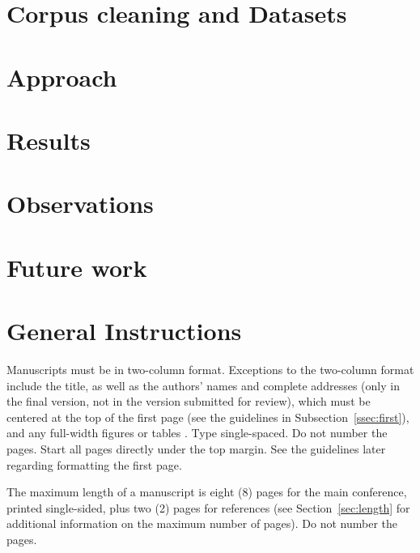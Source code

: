 \documentclass[11pt,letterpaper]{article}
\begin{document}
\section{Corpus cleaning and Datasets}

\section{Approach}

\section{Results}

\section{Observations}

\section{Future work}

\section{General Instructions}

Manuscripts must be in two-column format.  Exceptions to the
two-column format include the title, as well as the 
authors' names and complete
addresses (only in the final version, not in the version submitted for review), 
which must be centered at the top of the first page (see
the guidelines in Subsection~\ref{ssec:first}), and any full-width
figures or tables .  Type single-spaced.  Do not number the pages.
Start all pages directly under the top margin.  See the guidelines
later regarding formatting the first page.



The maximum length of a manuscript is eight (8) pages for the main
conference, printed single-sided, plus two (2) pages for references
(see Section~\ref{sec:length} for additional information on the
maximum number of pages).  Do not number the pages.
\end{document}
